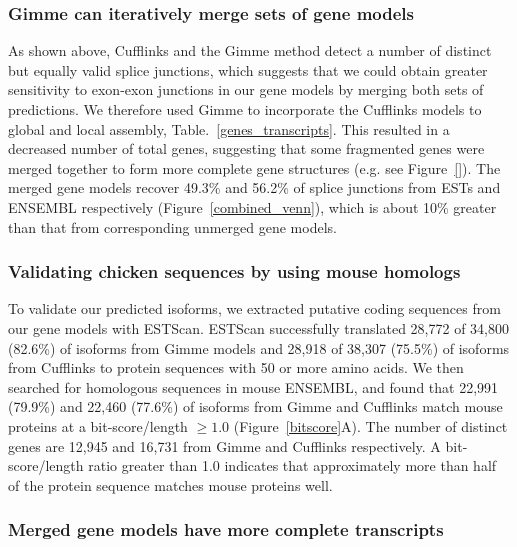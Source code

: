 \documentclass[10pt]{article}
\begin{document}
\subsubsection*{Gimme can iteratively merge sets of gene models}


As shown above, Cufflinks and the Gimme method detect a number of distinct but
equally valid splice junctions, which suggests that we could obtain greater
sensitivity to exon-exon junctions in our gene models by merging both sets of
predictions.  We therefore used Gimme to incorporate the Cufflinks models to
global and local assembly, Table.~\ref{genes_transcripts}.  This resulted in a
decreased number of total genes, suggesting that some fragmented genes were
merged together to form more complete gene structures (e.g. see
Figure~\ref{}). The merged gene models recover 49.3\% and 56.2\% of
splice junctions from ESTs and ENSEMBL respectively
(Figure~\ref{combined_venn}), which is about 10\% greater than that from
corresponding unmerged gene models.


\subsubsection*{Validating chicken sequences by using mouse homologs}

To validate our predicted isoforms, we extracted putative coding
sequences from our gene models with ESTScan\cite{Iseli:1999vd}.
ESTScan successfully translated 28,772 of 34,800 (82.6\%) of
isoforms from Gimme models and 28,918 of 38,307 (75.5\%) of
isoforms from Cufflinks to protein sequences with 50 or more
amino acids.  We then searched for homologous sequences in mouse
ENSEMBL, and found that 22,991 (79.9\%) and 22,460 (77.6\%) of
isoforms from Gimme and Cufflinks match mouse proteins at a
bit-score/length $\ge1.0$ (Figure~\ref{bitscore}A).  The number of
distinct genes are 12,945 and 16,731 from Gimme and Cufflinks
respectively.  A bit-score/length ratio greater than 1.0 indicates
that approximately more than half of the protein sequence matches
mouse proteins well.

\subsubsection*{Merged gene models have more complete
transcripts}
\end{document}
